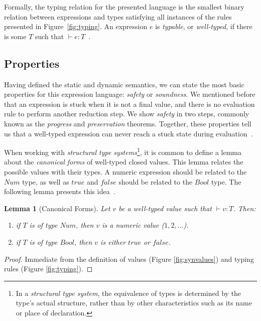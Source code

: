 \documentclass[tese,capa,english]{texufpel}
\newtheorem{lemma}{Lemma}
\begin{document}
Formally, the typing relation for the presented language is the smallest binary relation between expressions and types satisfying all instances of the rules presented in Figure~\ref{fig:typing}. An expression $e$ is \emph{typable}, or \emph{well-typed}, if there is some $T$ such that $\vdash e : T$~\cite{Pierce:2002:TPL:509043}.

\subsection{Properties}

Having defined the static and dynamic semantics, we can state the most basic properties for this expression language: \emph{safety} or \emph{soundness}. We mentioned before that an expression is stuck when it is not a final value, and there is no evaluation rule to perform another reduction step. We show \emph{safety} in two steps, commonly known as the \emph{progress} and \emph{preservation} theorems. Together, these properties tell us that a well-typed expression can never reach a stuck state during evaluation~\cite{Pierce:2002:TPL:509043}.

When working with \emph{structural type systems}\footnote{In a \emph{structural type system}, the equivalence of types is determined by the type's actual structure, rather than by other characteristics such as its name or place of declaration.}, it is common to define a lemma about the \emph{canonical forms} of well-typed closed values. This lemma relates the possible values with their types. A numeric expression should be related to the $Num$ type, as well as $true$ and $false$ should be related to the $Bool$ type. The following lemma presents this idea~\cite{Harper:2016:PFP:3002812}.

\begin{lemma}[Canonical Forms]
\label{lem:canexp}
Let $v$ be a well-typed value such that $\vdash v : T$. Then: \\
\begin{enumerate}
\vspace{-4ex}
\item if $T$ is of type $Num$, then $v$ is a numeric value ($1, 2, ...$). \\
\vspace{-4ex}
\item if $T$ is of type $Bool$, then $v$ is either $true$ or $false$.
\end{enumerate}
\end{lemma}

\begin{proof}
Immediate from the definition of values (Figure \ref{fig:synvalues}) and typing rules (Figure \ref{fig:typing}).
\end{proof}
\end{document}
